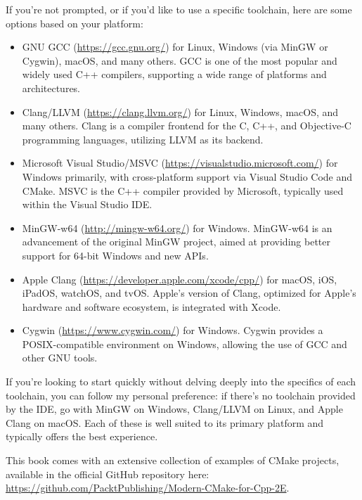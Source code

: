 If you’re not prompted, or if you’d like to use a specific toolchain, here are some options based on your platform:

\begin{itemize}
\item
GNU GCC (\url{https://gcc.gnu.org/}) for Linux, Windows (via MinGW or Cygwin), macOS, and many others. GCC is one of the most popular and widely used C++ compilers, supporting a wide range of platforms and architectures.

\item
Clang/LLVM (\url{https://clang.llvm.org/}) for Linux, Windows, macOS, and many others.
Clang is a compiler frontend for the C, C++, and Objective-C programming languages, utilizing LLVM as its backend.

\item
Microsoft Visual Studio/MSVC (\url{https://visualstudio.microsoft.com/}) for Windows primarily, with cross-platform support via Visual Studio Code and CMake. MSVC is the C++ compiler provided by Microsoft, typically used within the Visual Studio IDE.

\item
MinGW-w64 (\url{http://mingw-w64.org/}) for Windows. MinGW-w64 is an advancement of the original MinGW project, aimed at providing better support for 64-bit Windows and new APIs.

\item
Apple Clang (\url{https://developer.apple.com/xcode/cpp/}) for macOS, iOS, iPadOS, watchOS, and tvOS. Apple’s version of Clang, optimized for Apple’s hardware and software ecosystem, is integrated with Xcode.

\item
Cygwin (\url{https://www.cygwin.com/}) for Windows. Cygwin provides a POSIX-compatible environment on Windows, allowing the use of GCC and other GNU tools.
\end{itemize}

If you’re looking to start quickly without delving deeply into the specifics of each toolchain, you can follow my personal preference: if there’s no toolchain provided by the IDE, go with MinGW on Windows, Clang/LLVM on Linux, and Apple Clang on macOS. Each of these is well suited to its primary platform and typically offers the best experience.


This book comes with an extensive collection of examples of CMake projects, available in the official GitHub repository here: \url{https://github.com/PacktPublishing/Modern-CMake-for-Cpp-2E}.

